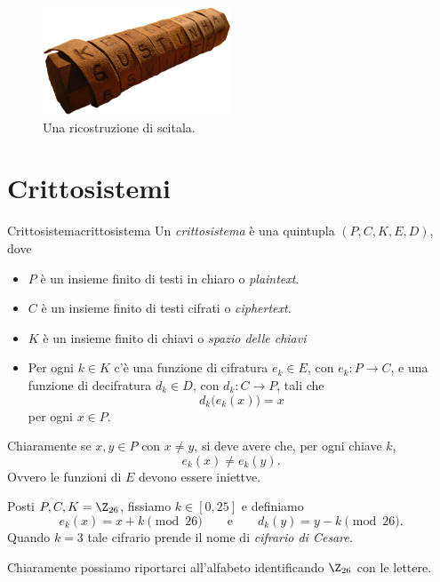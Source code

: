 	\begin{figure}[tb]
	\centering
		\includegraphics[width=0.5\textwidth]{Immagini/scitala.png}
		\caption{Una ricostruzione di scitala.}
		\label{fig:scitala}
	\end{figure}

\section{Crittosistemi}

	\begin{defn}{Crittosistema}{crittosistema}
	Un \emph{crittosistema} è una quintupla \((P,C,K,E,D)\), dove
	\begin{itemize}
		\item \(P\) è un insieme finito di testi in chiaro o \emph{plaintext}.
		\item \(C\) è un insieme finito di testi cifrati o \emph{ciphertext}.
		\item \(K\) è un insieme finito di chiavi o \emph{spazio delle chiavi}
		\item Per ogni \(k\in K\) c'è una funzione di cifratura \(e_k\in E\), con \(e_k\colon P \to C\), e una funzione di decifratura \(d_k\in D\), con \(d_k\colon C \to P\), tali che
			\[
			d_k\big(e_k(x)\big) = x
			\]
		per ogni \(x\in P\).
	\end{itemize}
	\end{defn}
	
	\begin{oss}
	Chiaramente se \(x,y\in P\) con \(x\neq y\), si deve avere che, per ogni chiave \(k\),
		\[
		e_k(x) \neq e_k(y).
		\]
	Ovvero le funzioni di \(E\) devono essere iniettve.
	\end{oss}

	\begin{ese}
	Posti \(P,C,K=\Z_{26}\), fissiamo \(k\in[0,25]\) e definiamo
		\[
		e_k(x) = x+k \pmod{26} \qquad\text{e}\qquad d_k(y) = y-k \pmod{26}.
		\]
	Quando \(k=3\) tale cifrario prende il nome di \emph{cifrario di Cesare}.

	Chiaramente possiamo riportarci all'alfabeto identificando \(\Z_{26}\) con le lettere.
	\end{ese}

